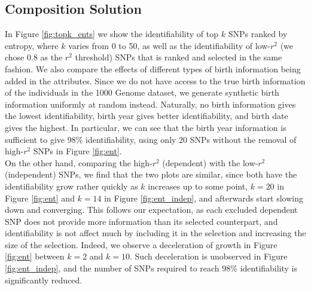 \documentclass[14pt, oneside]{article}   	%
\begin{document}
\subsection{Composition Solution}
In Figure \ref{fig:topk_ents} we show the identifiability of top $k$ SNPs ranked by entropy, where $k$ varies from 0 to 50,
as well as the identifiability of low-$r^2$ (we chose 0.8 as the $r^2$ threshold) SNPs that is ranked and selected in the same fashion.
We also compare the effects of different types of birth information being added in the attributes.
Since we do not have access to the true birth information of the individuals in the 1000 Genome dataset,
we generate synthetic birth information uniformly at random instead.
Naturally, no birth information gives the lowest identifiability, birth year gives better identifiability, and birth date gives the highest.
In particular, we can see that the birth year information is sufficient to give $98\%$ identifiability,
using only $20$ SNPs without the removal of high-$r^2$ SNPs in Figure \ref{fig:ent}.
\\
On the other hand, comparing the high-$r^2$ (dependent) with the low-$r^2$ (independent) SNPs, 
we find that the two plots are similar, since both have the identifiability grow rather quickly as $k$ increases up to some point,
$k=20$ in Figure \ref{fig:ent} and $k=14$ in Figure \ref{fig:ent_indep}, and afterwards start slowing down and converging.
This follows our expectation, as each excluded dependent SNP does not provide more information than its selected counterpart,
and identifiability is not affect much by including it in the selection and increasing the size of the selection.
Indeed, we observe a deceleration of growth in Figure \ref{fig:ent} between $k=2$ and $k=10$.
Such deceleration is unobserved in Figure \ref{fig:ent_indep}, and the number of SNPs required to reach $98\%$ identifiability is significantly reduced.
%
%
%
%
\end{document}
